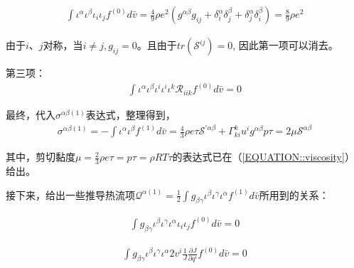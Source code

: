 \documentclass[LBMDerivation.tex]{subfiles}
\begin{document}
\begin{equation}
  \begin{gathered}
    \int \iota^\alpha \iota^\beta \iota_i \iota_j  f^{(0)}  d \bar{v}=\frac{4}{9}\rho e^2 (g^{\alpha \beta}g_{ij}+\delta^{\alpha}_i \delta^{\beta}_j+\delta^{\alpha}_j \delta^{\beta}_i)=\frac{8}{9}\rho e^2
  \end{gathered}
\end{equation}

由于$i$、$j$对称，当$i\neq j,g_{ij}=0$。且由于$tr(\mathcal{S}^{ij})=0$, 因此第一项可以消去。

第三项：
\begin{equation}
  \begin{gathered}
    \int \iota^\alpha \iota^\beta \iota^i\iota^i\iota^k \mathcal{R}_{iik}  f^{(0)}   d \bar{v} =0
  \end{gathered}
\end{equation}




最终，代入$\sigma^{\alpha\beta(1)}$表达式，整理得到，
\begin{equation}
  \begin{gathered}
    \sigma^{\alpha\beta(1)} =-\int \iota^{\alpha} \iota^{\beta} f^{(1)}  d \bar{v}
    = \frac{4}{3} \rho e \tau  \mathcal{S}^{'\alpha\beta} +   \Gamma_{ki}^k u^i g^{\alpha\beta} p\tau =  2 \mu \mathcal{S}^{\alpha\beta}
  \end{gathered}
\end{equation}


其中，剪切黏度$\mu=\frac{2}{3} \rho e \tau=p \tau=\rho R T \tau$的表达式已在（\ref{EQUATION::viscosity}）给出。


接下来，给出一些推导热流项$\mathcal{Q}^{\alpha (1)}=\frac{1}{2}\int g_{\beta\gamma} \iota^{\beta} \iota^{\gamma}  \iota^{\alpha} f^{(1)}  d \bar{v}$所用到的关系：

\begin{equation}
  \begin{gathered}
    \int g_{\beta\gamma} \iota^{\beta} \iota^{\gamma}  \iota^{\alpha} \iota_i \iota_j  f^{(0)}  d \bar{v} =0
  \end{gathered}
\end{equation}






\begin{equation}
  \begin{gathered}
    \int g_{\beta\gamma} \iota^{\beta} \iota^{\gamma} \iota^{\alpha} 2v^i  \frac{1}{J}\frac{\partial J}{\partial q^i}  f^{(0)} d \bar{v} = 0
  \end{gathered}
\end{equation}
\end{document}
